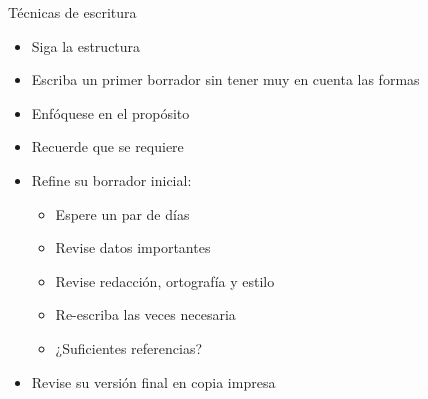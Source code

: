 \documentclass[
10pt,
aspectratio=169,
]{beamer}
\begin{document}
\begin{frame}[c]{T\'ecnicas de escritura}
\begin{itemize}
\item Siga la estructura
\item Escriba un primer borrador sin tener muy en cuenta las formas
\item Enf\'oquese en el prop\'osito
\item Recuerde que se requiere
\item Refine su borrador inicial:
\begin{itemize}
\item Espere un par de d\'ias
\item Revise datos importantes
\item Revise redacci\'on, ortograf\'ia y estilo
\item Re-escriba las veces necesaria
\item ¿Suficientes referencias?
\end{itemize}
\item Revise su versi\'on final en copia impresa
\end{itemize}
\end{frame}

%
\end{document}
